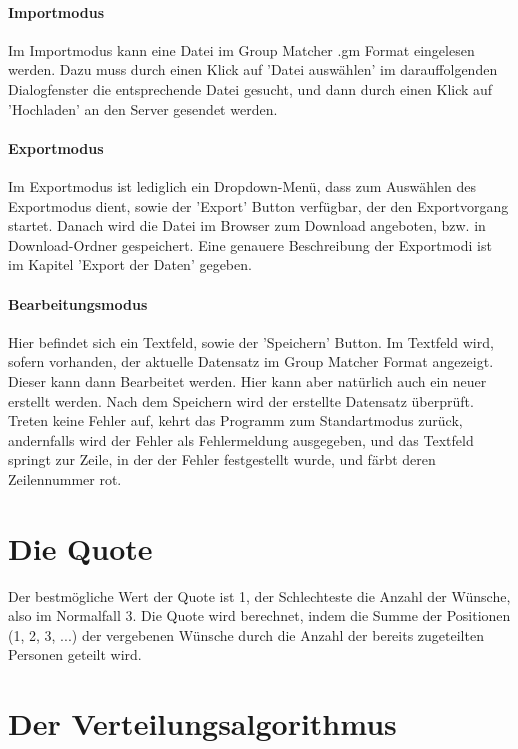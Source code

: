 \documentclass[a4paper,11pt]{article}
\begin{document}
\paragraph{Importmodus}
Im Importmodus kann eine Datei im Group Matcher .gm Format eingelesen werden. Dazu muss durch einen Klick auf 'Datei auswählen' im darauffolgenden Dialogfenster die entsprechende Datei gesucht, und dann durch einen Klick auf 'Hochladen' an den Server gesendet werden.

\paragraph{Exportmodus}
Im Exportmodus ist lediglich ein Dropdown-Menü, dass zum Auswählen des Exportmodus dient, sowie der 'Export' Button verfügbar, der den Exportvorgang startet. Danach wird die Datei im Browser zum Download angeboten, bzw. in Download-Ordner gespeichert. Eine genauere Beschreibung der Exportmodi ist im Kapitel 'Export der Daten' gegeben.

\paragraph{Bearbeitungsmodus}
Hier befindet sich ein Textfeld, sowie der 'Speichern' Button. Im Textfeld wird, sofern vorhanden, der aktuelle Datensatz im Group Matcher Format angezeigt. Dieser kann dann Bearbeitet werden. Hier kann aber natürlich auch ein neuer erstellt werden. Nach dem Speichern wird der erstellte Datensatz überprüft. Treten keine Fehler auf, kehrt das Programm zum Standartmodus zurück, andernfalls wird der Fehler als Fehlermeldung ausgegeben, und das Textfeld springt zur Zeile, in der der Fehler festgestellt wurde, und färbt deren Zeilennummer rot.


\section{Die Quote}
\label{sec:rate}

Der bestmögliche Wert der Quote ist 1, der Schlechteste die Anzahl der Wünsche, also im Normalfall 3. Die Quote wird berechnet, indem die Summe der Positionen (1, 2, 3, ...) der vergebenen Wünsche durch die Anzahl der bereits zugeteilten Personen geteilt wird.

\section{Der Verteilungsalgorithmus}
\label{sec:match}
\end{document}
